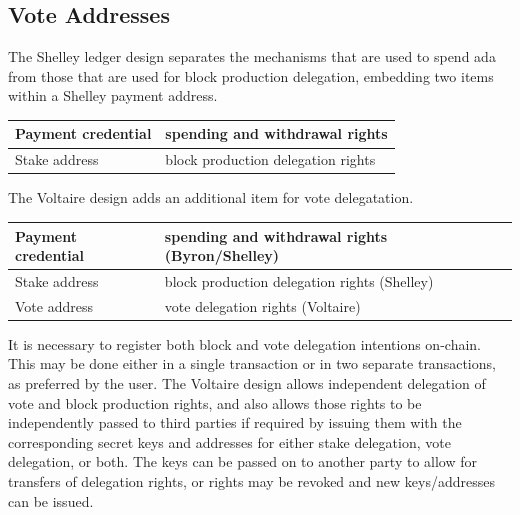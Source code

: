 \subsection{Vote Addresses}

The Shelley ledger design separates the mechanisms that are used to spend ada from those that are used for block production delegation, embedding two items within a Shelley payment address.

\begin{center}
  \begin{tabular}{||l|l||}
  \hline\hline
  Payment credential & spending and withdrawal rights \\\hline
  Stake address & block production delegation rights \\\hline
  \hline
  \end{tabular}
\end{center}

The Voltaire design adds an additional item for vote delegatation.

\begin{center}
  \begin{tabular}{||l|l||}
  \hline\hline
  Payment credential & spending and withdrawal rights (Byron/Shelley) \\\hline
  Stake address & block production delegation rights (Shelley) \\\hline
  Vote address & vote delegation rights (Voltaire) \\\hline
  \hline
\end{tabular}
\end{center}

It is necessary to register both block and vote delegation intentions on-chain.  This may be done either in a single transaction or in two separate transactions,
as preferred by the user.  The Voltaire design allows independent delegation of vote and block production rights,
and also allows those rights to be independently passed to third parties if required by issuing them with the corresponding secret keys and addresses for either stake delegation, vote delegation, or both.
The keys can be passed on to another party to allow for transfers of delegation rights, or rights may be revoked and new keys/addresses can be issued.

